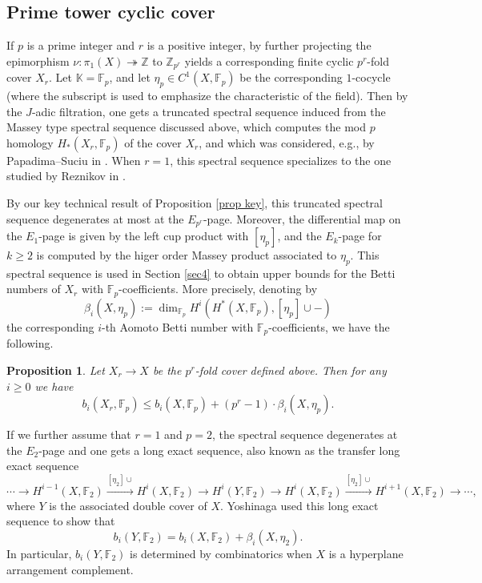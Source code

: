 \documentclass[12pt,leqno,twoside]{amsart}
\theoremstyle{plain}
\newtheorem{prop}[theorem]{Proposition}
\theoremstyle{definition}
\def\bp{\begin{prop}}
\def\ep{\end{prop}}
\newcommand{\Z}{\mathbb{Z}}
\newcommand{\K}{\mathbb{K}}
\newcommand{\F}{\mathbb{F}}
\begin{document}
\subsection{Prime tower cyclic cover}
If $p$ is a prime integer and $r$ is a positive integer, by further projecting the epimorphism $\nu \colon \pi_1(X)\twoheadrightarrow \Z$ to $\Z_{p^r}$ yields a corresponding finite cyclic $p^r$-fold cover $X_r$. 
Let $\K=\F_p$, and let $\eta_p \in C^1(X,\F_p)$ be the corresponding $1$-cocycle (where the subscript is used to emphasize the characteristic of the field). Then by the $J$-adic filtration, one gets a truncated spectral sequence induced from the Massey type spectral sequence discussed above, which computes the mod $p$ homology $H_*(X_r,\F_p)$ of the cover $X_r$, and which was considered, e.g.,  by Papadima--Suciu in \cite[Section 7.1]{PS10}. When $r=1$, this spectral sequence specializes to the one studied by Reznikov in  \cite{Rez}.

By our key technical result of Proposition \ref{prop key}, this truncated spectral sequence degenerates at most at the $E_{p^r}$-page. Moreover,  the differential map on the $E_1$-page  
is given by the left cup product with $[\eta_p]$, 
and  the $E_k$-page for $k\geq 2$ is computed by the higer order Massey product associated to $\eta_p$. This spectral sequence is used in Section \ref{sec4} to obtain upper bounds for the Betti numbers of $X_r$ with $\F_p$-coefficients. More precisely, 
denoting by $$\beta_i(X,\eta_p):=\dim_{\F_p} H^i(H^*(X,\F_p), [\eta_p]\cup -)$$ the corresponding $i$-th Aomoto Betti number with $\F_p$-coefficients, we have the following.

\bp \label{prop prime tower cover}
Let 
$X_r\to X$ be the $p^r$-fold cover defined above. 
Then for 
any $i\geq 0$ we have
\begin{equation}\label{iinequality}
   b_i(X_r,\F_p) \leq b_i(X,\F_p) + (p^r-1)\cdot \beta_i(X,\eta_p).
\end{equation}
\ep 


 If we further assume that $r=1$ and  $p=2$, the spectral sequence degenerates at {the} $E_2$-page and one gets a long exact sequence, also known as the transfer long exact sequence
$$ \cdots \to H^{i-1}(X,\F_2)  \xrightarrow{[\eta_2] \cup} H^{i}(X,\F_2) \to H^i(Y,\F_2) \to H^{i}(X,\F_2)  \xrightarrow{[\eta_2] \cup} H^{i+1}(X,\F_2)\to \cdots,$$
where $Y$ is the associated double cover of $X$. 
Yoshinaga \cite{Yos} used this long exact sequence to show that 
\begin{equation} \label{mod 2 equation}
    b_i(Y, \F_2)= b_i(X,\F_2)+\beta_i(X,\eta_2).
\end{equation}
In particular, $b_i(Y,\F_2)$ is determined by combinatorics when $X$ is a hyperplane arrangement complement.
\end{document}
